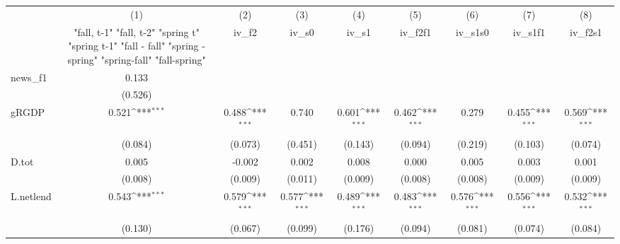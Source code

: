 {
\def\sym#1{\ifmmode^{#1}\else\(^{#1}\)\fi}
\begin{tabular}{l*{8}{c}}
\toprule
            &\multicolumn{1}{c}{(1)}&\multicolumn{1}{c}{(2)}&\multicolumn{1}{c}{(3)}&\multicolumn{1}{c}{(4)}&\multicolumn{1}{c}{(5)}&\multicolumn{1}{c}{(6)}&\multicolumn{1}{c}{(7)}&\multicolumn{1}{c}{(8)}\\
            &\multicolumn{1}{c}{  "fall, t-1" "fall, t-2" "spring t" "spring t-1"  "fall - fall" "spring - spring" "spring-fall" "fall-spring" }&\multicolumn{1}{c}{iv\_f2}&\multicolumn{1}{c}{iv\_s0}&\multicolumn{1}{c}{iv\_s1}&\multicolumn{1}{c}{iv\_f2f1}&\multicolumn{1}{c}{iv\_s1s0}&\multicolumn{1}{c}{iv\_s1f1}&\multicolumn{1}{c}{iv\_f2s1}\\
\midrule
news\_f1     &       0.133         &                     &                     &                     &                     &                     &                     &                     \\
            &     (0.526)         &                     &                     &                     &                     &                     &                     &                     \\
\addlinespace
gRGDP       &       0.521\sym{***}&       0.488\sym{***}&       0.740         &       0.601\sym{***}&       0.462\sym{***}&       0.279         &       0.455\sym{***}&       0.569\sym{***}\\
            &     (0.084)         &     (0.073)         &     (0.451)         &     (0.143)         &     (0.094)         &     (0.219)         &     (0.103)         &     (0.074)         \\
\addlinespace
D.tot       &       0.005         &      -0.002         &       0.002         &       0.008         &       0.000         &       0.005         &       0.003         &       0.001         \\
            &     (0.008)         &     (0.009)         &     (0.011)         &     (0.009)         &     (0.008)         &     (0.008)         &     (0.009)         &     (0.009)         \\
\addlinespace
L.netlend   &       0.543\sym{***}&       0.579\sym{***}&       0.577\sym{***}&       0.489\sym{***}&       0.483\sym{***}&       0.576\sym{***}&       0.556\sym{***}&       0.532\sym{***}\\
            &     (0.130)         &     (0.067)         &     (0.099)         &     (0.176)         &     (0.094)         &     (0.081)         &     (0.074)         &     (0.084)         \\

\end{tabular}}
